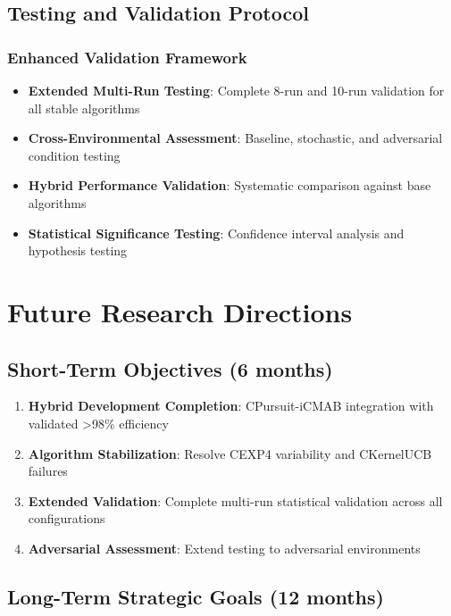 \documentclass[12pt,a4paper]{article}
\begin{document}
\subsection{Testing and Validation Protocol}

\subsubsection{Enhanced Validation Framework}

\begin{itemize}
\item \textbf{Extended Multi-Run Testing}: Complete 8-run and 10-run validation for all stable algorithms
\item \textbf{Cross-Environmental Assessment}: Baseline, stochastic, and adversarial condition testing
\item \textbf{Hybrid Performance Validation}: Systematic comparison against base algorithms
\item \textbf{Statistical Significance Testing}: Confidence interval analysis and hypothesis testing
\end{itemize}

\section{Future Research Directions}

\subsection{Short-Term Objectives (6 months)}

\begin{enumerate}
\item \textbf{Hybrid Development Completion}: CPursuit-iCMAB integration with validated >98\% efficiency
\item \textbf{Algorithm Stabilization}: Resolve CEXP4 variability and CKernelUCB failures
\item \textbf{Extended Validation}: Complete multi-run statistical validation across all configurations
\item \textbf{Adversarial Assessment}: Extend testing to adversarial environments
\end{enumerate}

\subsection{Long-Term Strategic Goals (12 months)}
\end{document}
